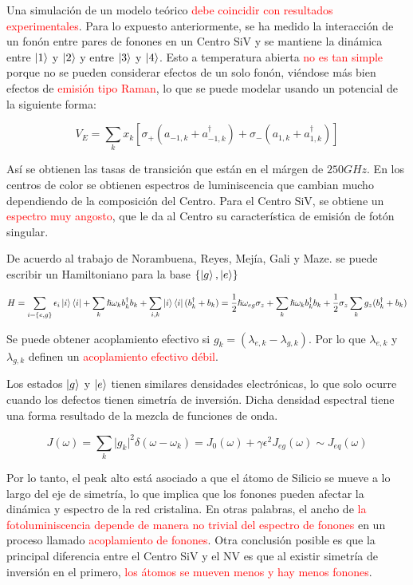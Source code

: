 \documentclass{book}
\begin{document}
Una simulación de un modelo teórico \textcolor{red}{debe coincidir con resultados experimentales}. Para lo expuesto anteriormente, se ha medido la interacción de un fonón entre pares de fonones en un Centro SiV y se mantiene la dinámica entre $\ket{1}$ y $\ket{2}$ y entre $\ket{3}$ y $\ket{4}$. Esto a temperatura abierta \textcolor{red}{no es tan simple} porque no se pueden considerar efectos de un solo fonón, viéndose más bien efectos de \textcolor{red}{emisión tipo Raman}, lo que se puede modelar usando un potencial de la siguiente forma:

\begin{equation}\label{eq8.22}V_E=\sum_k x_k[\sigma_+(a_{-1,k}+a^\dag_{-1,k})+\sigma_-(a_{1,k}+a^\dag_{1,k})]\end{equation}  

Así se obtienen las tasas de transición que están en el márgen de $250 GHz$. En los centros de color se obtienen espectros de luminiscencia que cambian mucho dependiendo de la composición del Centro. Para el Centro SiV, se obtiene un \textcolor{red}{espectro muy angosto}, que le da al Centro su característica de emisión de fotón singular.

De acuerdo al trabajo de Norambuena, Reyes, Mejía, Gali y Maze. se puede escribir un Hamiltoniano para la base $\{\ket{g},\ket{e}\}$

\begin{equation}\label{eq8.23}H=\sum_{i=\{e,g\}}\epsilon_i\ket{i}\bra{i}+\sum_k\hslash\omega_k b^\dag_k b_k+\sum_{i,k}\ket{i}\bra{i}(b_k^\dag+b_k)=\frac{1}{2}\hslash\omega_{eg}\sigma_z+\sum_k\hslash\omega_k b_k^\dag b_k+\frac{1}{2}\sigma_z\sum_k g_z(b_k^\dag+b_k)\end{equation}

Se puede obtener acoplamiento efectivo si $g_k=(\lambda_{e,k}-\lambda_{g,k})$. Por lo que $\lambda_{e,k}$ y $\lambda_{g,k}$ definen un \textcolor{red}{acoplamiento efectivo débil}.

Los estados $\ket{g}$ y $\ket{e}$ tienen similares densidades electrónicas, lo que solo ocurre cuando los defectos tienen simetría de inversión. Dicha densidad espectral tiene una forma resultado de la mezcla de funciones de onda.

\begin{equation}\label{eq8.24}J(\omega)=\sum_k \lvert g_k \rvert^2\delta(\omega-\omega_k)=J_0(\omega)+\gamma\epsilon^2 J_{eg}(\omega)\sim J_{eq}(\omega)\end{equation}

Por lo tanto, el peak alto está asociado a que el átomo de Silicio se mueve a lo largo del eje de simetría, lo que implica que los fonones pueden afectar la dinámica y espectro de la red cristalina. En otras palabras, el ancho de \textcolor{red}{la fotoluminiscencia depende de manera no trivial del espectro de fonones} en un proceso llamado \textcolor{red}{acoplamiento de fonones}. Otra conclusión posible es que la principal diferencia entre el Centro SiV y el NV es que al existir simetría de inversión en el primero, \textcolor{red}{los átomos se mueven menos y hay menos fonones}.
\end{document}
